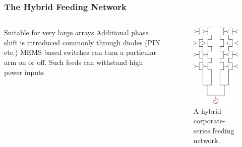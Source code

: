 \documentclass[10pt]{beamer}
\begin{document}
\begin{frame}
    \frametitle{The Hybrid Feeding Network}
    \begin{columns}[] %
        \begin{column}{.5\textwidth}
            \begin{outline}
                \1 Suitable for very large arrays
                \2 Additional phase shift is introduced commonly through diodes (PIN etc.)
                \1 MEMS based switches can turn a particular arm on or off.
                \2 Such feeds can withstand high power inputs
            \end{outline}   
        \end{column}
        \begin{column}{.5\textwidth}
            \begin{figure}[h!]
                \centering
                \includegraphics[width=.6\textwidth]{hybrid.pdf}
                \caption{A hybrid corporate-series feeding network.}
            \end{figure}
        \end{column}%
    \end{columns}
\end{frame}
\end{document}
